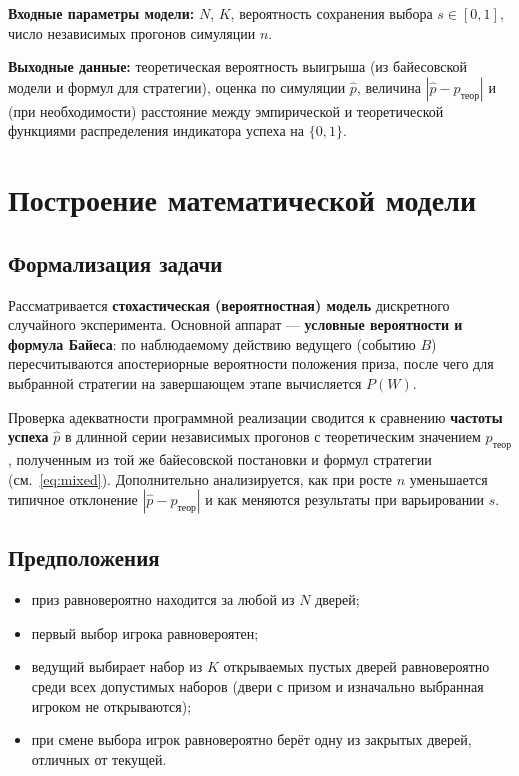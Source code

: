 \documentclass[a4paper, 14pt]{extarticle}
\begin{document}
\textbf{Входные параметры модели:} $N$, $K$, вероятность сохранения выбора $s \in [0,1]$, число независимых прогонов симуляции $n$.

\textbf{Выходные данные:} теоретическая вероятность выигрыша (из байесовской модели и формул для стратегии), оценка по симуляции $\hat p$, величина $| \hat p - p_{\text{теор}} |$ и (при необходимости) расстояние между эмпирической и теоретической функциями распределения индикатора успеха на $\{0,1\}$.

\section{Построение математической модели}

\subsection{Формализация задачи}
Рассматривается \textbf{стохастическая (вероятностная) модель} дискретного случайного эксперимента. Основной аппарат --- \textbf{условные вероятности и формула Байеса}: по наблюдаемому действию ведущего (событию $B$) пересчитываются апостериорные вероятности положения приза, после чего для выбранной стратегии на завершающем этапе вычисляется $P(W)$.

Проверка адекватности программной реализации сводится к сравнению \textbf{частоты успеха} $\hat p$ в длинной серии независимых прогонов с теоретическим значением $p_{\text{теор}}$, полученным из той же байесовской постановки и формул стратегии (см.~\eqref{eq:mixed}). Дополнительно анализируется, как при росте $n$ уменьшается типичное отклонение $|\hat p - p_{\text{теор}}|$ и как меняются результаты при варьировании $s$.

\subsection{Предположения}
\begin{itemize}[nosep]
  \item приз равновероятно находится за любой из $N$ дверей;
  \item первый выбор игрока равновероятен;
  \item ведущий выбирает набор из $K$ открываемых пустых дверей равновероятно среди всех допустимых наборов (двери с призом и изначально выбранная игроком не открываются);
  \item при смене выбора игрок равновероятно берёт одну из закрытых дверей, отличных от текущей.
\end{itemize}
\end{document}
